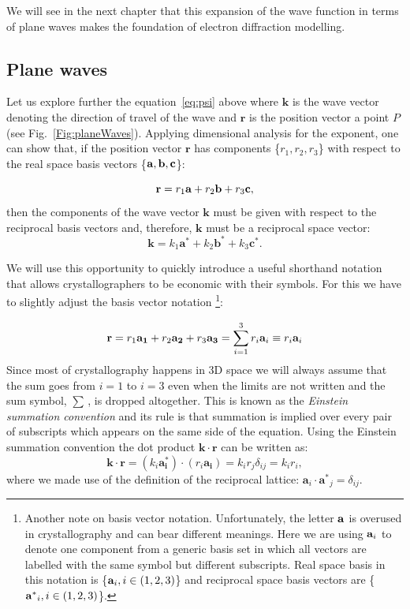 We will see in the next chapter that this expansion of the wave function in terms of plane waves makes the foundation of electron diffraction modelling. 

\pagebreak

%
\subsection{Plane waves}
\label{sec:planeWave}
Let us explore further the equation~\ref{eq:psi} above where $\mathbf{k}$ is the wave vector denoting the direction of travel of the wave and $\mathbf{r}$ is the position vector a point $P$ (see Fig.~\ref{Fig:planeWaves}).
\def\symbola{a}
Applying dimensional analysis for the exponent, one can show that, if the position vector $\mathbf{r}$ has components \{$r_1, r_2, r_3$\} with respect to the real space basis vectors \{$\vb{a}, \vb{b}, \vb{c}$\}:

\begin{equation*}
\mathbf{r} = r_1 \vb{a}  + r_2 \vb{b}  + r_3 \vb{c} ,
\end{equation*}
then the components of the wave vector $\mathbf{k}$ must be given with respect to the reciprocal basis vectors and, therefore, $\mathbf{k}$ must be a reciprocal space vector:
\begin{equation*}
\mathbf{k} = k_1 \mathbf{a^*} + k_2 \mathbf{b^*} + k_3 \mathbf{c^*}.
\end{equation*}

We will use this opportunity to quickly introduce a useful shorthand notation that allows crystallographers to be economic with their symbols. For this we have to slightly adjust the basis vector notation \footnote{ Another note on basis vector notation. Unfortunately, the letter $\vb{a}$ is overused in crystallography and can bear different meanings. Here we are using $\vb{a}_i$ to denote one component from a generic basis set in which all vectors are labelled with the same symbol but different subscripts. Real space basis in this notation is \{$\vb{a}_i, i \in (1, 2, 3)$\} and reciprocal space basis vectors are \{$\vb{a^*}_i, i \in (1, 2, 3)$\}.}:

\begin{equation*}
\mathbf{r}= r_1\vb{a_1} +r_2\vb{a_2}+r_3\vb{a_3}=\sum_{i=1}^3r_i \vb{a}_i\equiv r_i \vb{a}_i
\end{equation*}
\label{par:Einstein}
Since most of crystallography happens in 3D space we will always assume that the sum goes from $i=1$ to $i=3$ even when the limits are not written and the sum symbol, $\sum \,$, is dropped altogether. This is known as the \textit{Einstein summation convention} and its rule is that summation is implied over every pair of subscripts which appears on the same side of the equation. Using the Einstein summation convention the dot product $\mathbf{k} \cdot \mathbf{r}$ can be written as:
\begin{equation*}
\mathbf{k} \cdot \mathbf{r} = (k_i \mathbf{a_i^*})\cdot (r_i \mathbf{a_i}) = k_i r_j \delta_{ij} = k_i r_i,
\end{equation*}
where we made use of the definition of the reciprocal lattice: $\mathbf{a}_i\cdot \mathbf{a^*}_j=\delta_{ij}$.


